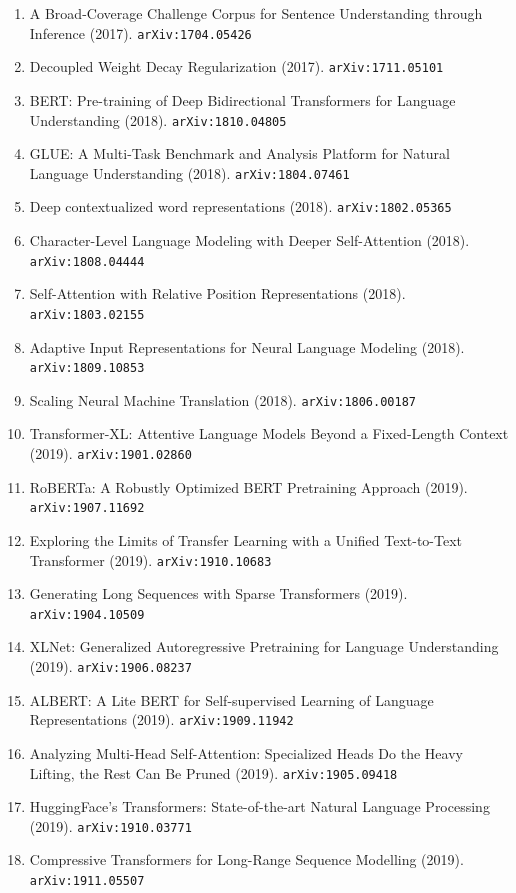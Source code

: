 \documentclass[11pt]{article}
\begin{document}
\begin{enumerate}
  \item A Broad-Coverage Challenge Corpus for Sentence Understanding through
  Inference (2017). \texttt{arXiv:1704.05426}
  \item Decoupled Weight Decay Regularization (2017). \texttt{arXiv:1711.05101}
  \item BERT: Pre-training of Deep Bidirectional Transformers for Language
  Understanding (2018). \texttt{arXiv:1810.04805}
  \item GLUE: A Multi-Task Benchmark and Analysis Platform for Natural Language
  Understanding (2018). \texttt{arXiv:1804.07461}
  \item Deep contextualized word representations (2018). \texttt{arXiv:1802.05365}
  \item Character-Level Language Modeling with Deeper Self-Attention (2018). \texttt{arXiv:1808.04444}
  \item Self-Attention with Relative Position Representations (2018). \texttt{arXiv:1803.02155}
  \item Adaptive Input Representations for Neural Language Modeling (2018). \texttt{arXiv:1809.10853}
  \item Scaling Neural Machine Translation (2018). \texttt{arXiv:1806.00187}
  \item Transformer-XL: Attentive Language Models Beyond a Fixed-Length Context (2019). \texttt{arXiv:1901.02860}
  \item RoBERTa: A Robustly Optimized BERT Pretraining Approach (2019). \texttt{arXiv:1907.11692}
  \item Exploring the Limits of Transfer Learning with a Unified Text-to-Text
  Transformer (2019). \texttt{arXiv:1910.10683}
  \item Generating Long Sequences with Sparse Transformers (2019). \texttt{arXiv:1904.10509}
  \item XLNet: Generalized Autoregressive Pretraining for Language Understanding (2019). \texttt{arXiv:1906.08237}
  \item ALBERT: A Lite BERT for Self-supervised Learning of Language
  Representations (2019). \texttt{arXiv:1909.11942}
  \item Analyzing Multi-Head Self-Attention: Specialized Heads Do the Heavy
  Lifting, the Rest Can Be Pruned (2019). \texttt{arXiv:1905.09418}
  \item HuggingFace's Transformers: State-of-the-art Natural Language Processing (2019). \texttt{arXiv:1910.03771}
  \item Compressive Transformers for Long-Range Sequence Modelling (2019). \texttt{arXiv:1911.05507}

\end{enumerate}
\end{document}

